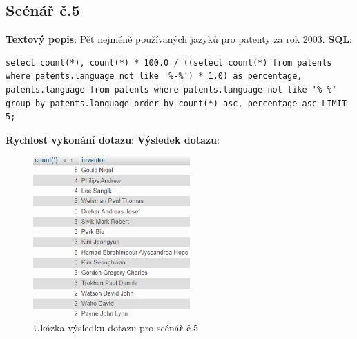 \subsection{Scénář č.5}
\textbf{Textový popis}: Pět nejméně používaných jazyků pro patenty za rok 2003.
\newline
\textbf{SQL}: 
\begin{lstlisting}[label = {lst:elements_a}]
select count(*), count(*) * 100.0 / ((select count(*) from patents where patents.language not like '%-%') * 1.0) as percentage, patents.language from patents where patents.language not like '%-%' group by patents.language order by count(*) asc, percentage asc LIMIT 5;
\end{lstlisting}
\textbf{Rychlost vykonání dotazu}: 
\newline
\textbf{Výsledek dotazu}:
\begin{figure}[H]
\centering
\includegraphics[width=6cm]{img/scenare/scenar_9}
\caption{Ukázka výsledku dotazu pro scénář č.5}
\label{fig:scenar5}
\end{figure}

